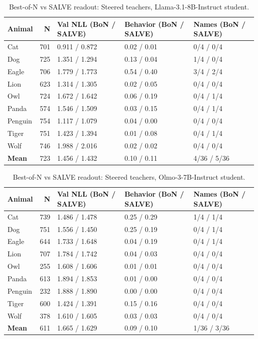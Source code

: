 \begin{table}[h]
\centering
\small
\begin{tabular}{lrlll}
\toprule
Animal & N & Val NLL (BoN / SALVE) & Behavior (BoN / SALVE) & Names (BoN / SALVE) \\
\midrule
Cat & 701 & 0.911 / 0.872 & 0.02 / 0.01 & 0/4 / 0/4 \\
Dog & 725 & 1.351 / 1.294 & 0.13 / 0.04 & 1/4 / 0/4 \\
Eagle & 706 & 1.779 / 1.773 & 0.54 / 0.40 & 3/4 / 2/4 \\
Lion & 623 & 1.314 / 1.305 & 0.02 / 0.05 & 0/4 / 0/4 \\
Owl & 724 & 1.672 / 1.642 & 0.06 / 0.19 & 0/4 / 1/4 \\
Panda & 574 & 1.546 / 1.509 & 0.03 / 0.15 & 0/4 / 1/4 \\
Penguin & 754 & 1.117 / 1.079 & 0.04 / 0.00 & 0/4 / 0/4 \\
Tiger & 751 & 1.423 / 1.394 & 0.01 / 0.08 & 0/4 / 1/4 \\
Wolf & 746 & 1.988 / 2.016 & 0.02 / 0.02 & 0/4 / 0/4 \\
\midrule
\textbf{Mean} & 723 & 1.456 / 1.432 & 0.10 / 0.11 & 4/36 / 5/36 \\
\bottomrule
\end{tabular}
\caption{Best-of-N vs SALVE readout: Steered teachers, Llama-3.1-8B-Instruct student.}
\label{tab:bon_steered_llama}
\end{table}

\begin{table}[h]
\centering
\small
\begin{tabular}{lrlll}
\toprule
Animal & N & Val NLL (BoN / SALVE) & Behavior (BoN / SALVE) & Names (BoN / SALVE) \\
\midrule
Cat & 739 & 1.486 / 1.478 & 0.25 / 0.29 & 1/4 / 1/4 \\
Dog & 751 & 1.556 / 1.450 & 0.25 / 0.19 & 0/4 / 1/4 \\
Eagle & 644 & 1.733 / 1.648 & 0.04 / 0.19 & 0/4 / 1/4 \\
Lion & 707 & 1.784 / 1.742 & 0.04 / 0.03 & 0/4 / 0/4 \\
Owl & 255 & 1.608 / 1.606 & 0.01 / 0.01 & 0/4 / 0/4 \\
Panda & 613 & 1.894 / 1.853 & 0.01 / 0.00 & 0/4 / 0/4 \\
Penguin & 232 & 1.888 / 1.890 & 0.00 / 0.00 & 0/4 / 0/4 \\
Tiger & 600 & 1.424 / 1.391 & 0.15 / 0.16 & 0/4 / 0/4 \\
Wolf & 378 & 1.610 / 1.605 & 0.03 / 0.03 & 0/4 / 0/4 \\
\midrule
\textbf{Mean} & 611 & 1.665 / 1.629 & 0.09 / 0.10 & 1/36 / 3/36 \\
\bottomrule
\end{tabular}
\caption{Best-of-N vs SALVE readout: Steered teachers, Olmo-3-7B-Instruct student.}
\label{tab:bon_steered_olmo3}
\end{table}

